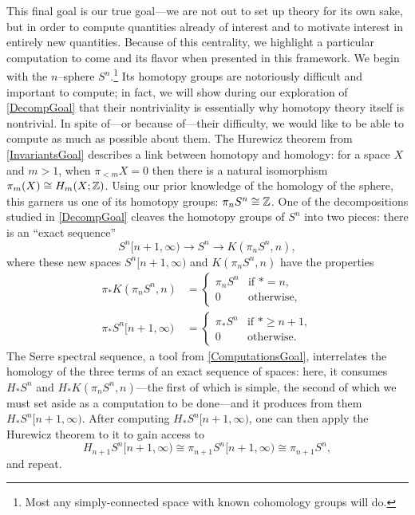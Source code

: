This final goal is our true goal---we are not out to set up theory for its own sake, but in order to compute quantities already of interest and to motivate interest in entirely new quantities.  Because of this centrality, we highlight a particular computation to come and its flavor when presented in this framework.  We begin with the $n$--sphere $S^n$.\footnote{Most any simply-connected space with known cohomology groups will do.}  Its homotopy groups are notoriously difficult and important to compute; in fact, we will show during our exploration of \eqref{DecompGoal} that their nontriviality is essentially why homotopy theory itself is nontrivial.  In spite of---or because of---their difficulty, we would like to be able to compute as much as possible about them.  The Hurewicz theorem from \eqref{InvariantsGoal} describes a link between homotopy and homology: for a space $X$ and $m > 1$, when $\pi_{< m} X = 0$ then there is a natural isomorphism $\pi_m(X) \cong H_m(X; \mathbb Z)$.  Using our prior knowledge of the homology of the sphere, this garners us one of its homotopy groups: $\pi_n S^n \cong \mathbb Z$.  One of the decompositions studied in \eqref{DecompGoal} cleaves the homotopy groups of $S^n$ into two pieces: there is an ``exact sequence'' \[S^n[n+1, \infty) \to S^n \to K(\pi_n S^n, n),\] where these new spaces $S^n[n+1, \infty)$ and $K(\pi_n S^n, n)$ have the properties
\begin{align*}
\pi_* K(\pi_n S^n, n) & = \begin{cases} \pi_n S^n & \text{if $* = n$}, \\ 0 & \text{otherwise}, \end{cases} \\
\pi_* S^n[n+1, \infty) & = \begin{cases} \pi_* S^n & \text{if $* \ge n + 1$}, \\ 0 & \text{otherwise}. \end{cases}
\end{align*}
The Serre spectral sequence, a tool from \eqref{ComputationsGoal}, interrelates the homology of the three terms of an exact sequence of spaces: here, it consumes $H_* S^n$ and $H_* K(\pi_n S^n, n)$---the first of which is simple, the second of which we must set aside as a computation to be done---and it produces from them $H_* S^n[n+1, \infty)$.  After computing $H_* S^n[n+1, \infty)$, one can then apply the Hurewicz theorem to it to gain access to \[H_{n+1} S^n[n+1, \infty) \cong \pi_{n+1} S^n[n+1, \infty) \cong \pi_{n+1} S^n,\] and repeat.





